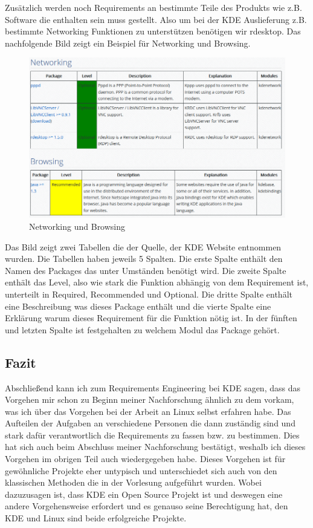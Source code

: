 Zusätzlich werden noch Requirements an bestimmte Teile des Produkts wie z.B.
Software die enthalten sein muss gestellt. Also um bei der KDE Auslieferung z.B.
bestimmte Networking Funktionen zu unterstützen benötigen wir rdesktop. Das
nachfolgende Bild zeigt ein Beispiel für Networking und Browsing.
\begin{figure}[h]
\includegraphics[width=\columnwidth]{images/KDE_Net_B.png}
\caption{Networking und Browsing\cite{6}}
\end{figure}
Das Bild zeigt zwei Tabellen die der Quelle, der KDE
Website entnommen wurden\cite{6}.
Die Tabellen haben jeweils 5 Spalten. Die erste Spalte enthält den Namen des
Packages das unter Umständen benötigt wird. Die zweite Spalte enthält das Level,
also wie stark die Funktion abhängig von dem Requirement ist, unterteilt in
Required, Recommended und Optional. Die dritte Spalte enthält eine Beschreibung
was dieses Package enthält und die vierte Spalte eine Erklärung warum dieses
Requirement für die Funktion nötig ist. In der fünften und letzten Spalte ist
festgehalten zu welchem Modul das Package gehört.

\subsection{Fazit}
Abschließend kann ich zum Requirements Engineering bei KDE sagen, dass das
Vorgehen mir schon zu Beginn meiner Nachforschung ähnlich zu dem vorkam, was ich
über das Vorgehen bei der Arbeit an Linux selbst erfahren habe. Das Aufteilen
der Aufgaben an verschiedene Personen die dann zuständig sind und stark dafür
verantwortlich die Requirements zu fassen bzw. zu bestimmen. Dies hat sich
auch beim Abschluss meiner Nachforschung bestätigt, weshalb ich dieses Vorgehen
im obrigen Teil auch wiedergegeben habe. Dieses Vorgehen ist für gewöhnliche
Projekte eher untypisch und unterschiedet sich auch von den klassischen Methoden
die in der Vorlesung aufgeführt wurden. %
Wobei dazuzusagen ist, dass KDE ein Open Source Projekt ist und deswegen eine
andere Vorgehensweise erfordert und es genauso seine Berechtigung hat, den KDE
und Linux sind beide erfolgreiche Projekte.
